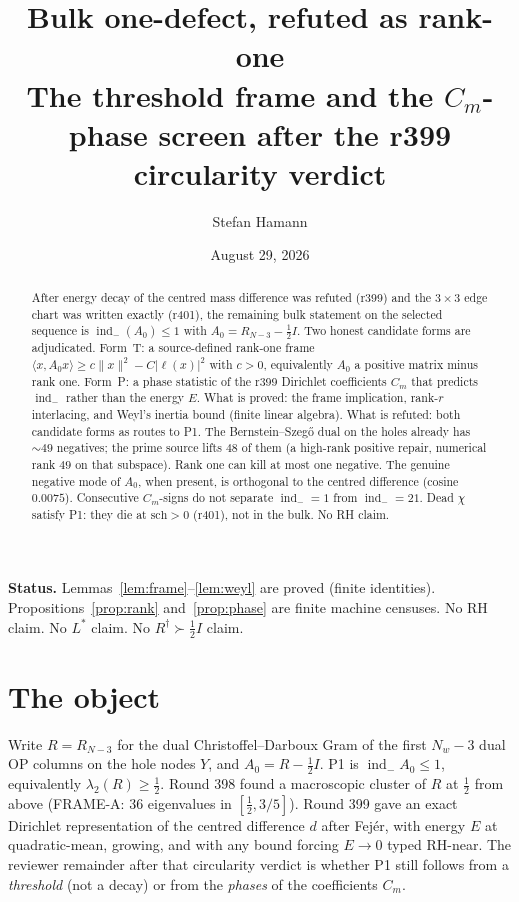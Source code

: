 \documentclass[11pt]{article}
\title{\bfseries Bulk one-defect, refuted as rank-one\\[2mm]
\large The threshold frame and the $C_m$-phase screen after
the r399 circularity verdict}
\author{Stefan Hamann}
\date{August 29, 2026}
\theoremstyle{remark}
\newcommand{\indm}{\operatorname{ind}_{-}}
\newcommand{\half}{\tfrac12}
\begin{document}
\maketitle

\begin{abstract}\noindent
After energy decay of the centred mass difference was refuted
(r399) and the $3\times 3$ edge chart was written exactly (r401),
the remaining bulk statement on the selected sequence is
$\indm(A_0)\le 1$ with $A_0=R_{N-3}-\half I$.
Two honest candidate forms are adjudicated.
Form~T: a source-defined rank-one frame
$\langle x,A_0 x\rangle\ge c\|x\|^2-C|\ell(x)|^2$ with $c>0$,
equivalently $A_0$ a positive matrix minus rank one.
Form~P: a phase statistic of the r399 Dirichlet coefficients
$C_m$ that predicts $\indm$ rather than the energy $E$.
What is proved: the frame implication, rank-$r$ interlacing,
and Weyl's inertia bound (finite linear algebra).
What is refuted: both candidate forms as routes to P1.
The Bernstein--Szeg\H{o} dual on the holes already has
$\sim 49$ negatives; the prime source lifts $48$ of them
(a high-rank positive repair, numerical rank $49$ on that
subspace).  Rank one can kill at most one negative.
The genuine negative mode of $A_0$, when present, is
orthogonal to the centred difference (cosine $0.0075$).
Consecutive $C_m$-signs do not separate $\indm=1$ from
$\indm=21$.  Dead $\chi$ satisfy P1: they die at
$\mathrm{sch}>0$ (r401), not in the bulk.
No RH claim.
\end{abstract}

\medskip\noindent
\textbf{Status.}\enspace
Lemmas~\ref{lem:frame}--\ref{lem:weyl} are proved (finite
identities).
Propositions~\ref{prop:rank} and~\ref{prop:phase} are finite
machine censuses.
No RH claim.  No $L^*$ claim.  No $R^\dagger\succ\half I$ claim.

\section{The object}\label{sec:obj}

Write $R=R_{N-3}$ for the dual Christoffel--Darboux Gram of
the first $N_w-3$ dual OP columns on the hole nodes $Y$, and
$A_0=R-\half I$.
P1 is $\indm A_0\le 1$, equivalently $\lambda_2(R)\ge\half$.
Round 398 found a macroscopic cluster of $R$ at $\half$ from
above (FRAME-A: $36$ eigenvalues in $[\half,3/5]$).
Round 399 gave an exact Dirichlet representation of the
centred difference $d$ after Fej\'er, with energy $E$ at
quadratic-mean, growing, and with any bound forcing $E\to 0$
typed RH-near.
The reviewer remainder after that circularity verdict is
whether P1 still follows from a \emph{threshold} (not a
decay) or from the \emph{phases} of the coefficients $C_m$.
\end{document}
